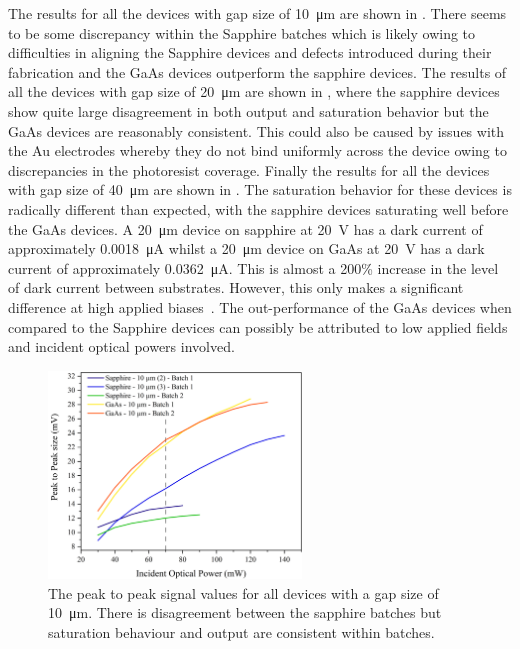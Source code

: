 The results for all the devices with gap size of \SI{10}{\micro\metre} are shown in . There seems to be some discrepancy within the Sapphire batches which is likely owing to difficulties in aligning the Sapphire devices and defects introduced during their fabrication and the GaAs devices outperform the sapphire devices. The results of all the devices with gap size of \SI{20}{\micro\metre} are shown in , where the sapphire devices show quite large disagreement in both output and saturation behavior but the GaAs devices are reasonably consistent. This could also be caused by issues with the Au electrodes whereby they do not bind uniformly across the device owing to discrepancies in the photoresist coverage. Finally the results for all the devices with gap size of \SI{40}{\micro\metre} are shown in . The saturation behavior for these devices is radically different than expected, with the sapphire devices saturating well before the GaAs devices. A \SI{20}{\micro\metre} device on sapphire at \SI{20}{V} has a dark current of approximately \SI{0.0018}{\micro\ampere} whilst a \SI{20}{\micro\metre} device on GaAs at \SI{20}{V} has a dark current of approximately \SI{0.0362}{\micro\ampere}. This is almost a 200\% increase in the level of dark current between substrates. However, this only makes a significant difference at high applied biases~\cite{Bacon2016}. The out\nobreakdash-performance of the GaAs devices when compared to the Sapphire devices can possibly be attributed to low applied fields and incident optical powers involved.

\begin{figure}[h!]
    \centering
    \includegraphics[width=0.6\textwidth]{Figures/Misc/SysDev/Opt10micronG.png}
    \captionsetup{font = footnotesize, justification = centering}
    \caption[The Peak to Peak Signal Values for all Devices with \SI{10}{\micro\metre} Gap]{The peak to peak signal values for all devices with a gap size of \SI{10}{\micro\metre}. There is disagreement between the sapphire batches but saturation behaviour and output are consistent within batches.}
    \label{fig:10micron}
\end{figure}

